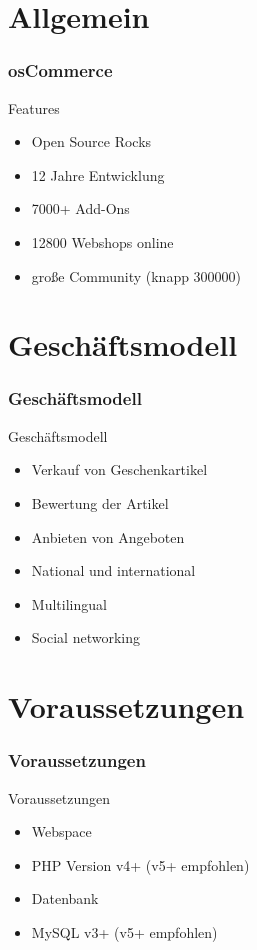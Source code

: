 \documentclass[xcolor=dvipsnames]{beamer}
\begin{document}
\section{Allgemein}
\begin{frame} %
  \frametitle{osCommerce} %
  \begin{block}{Features}
	  \begin{itemize}
		\item Open Source Rocks
		\item 12 Jahre Entwicklung
		\item 7000+ Add-Ons
		\item 12800 Webshops online
		\item große Community (knapp 300000)
	  \end{itemize}
  \end{block}
\end{frame}

\section{Geschäftsmodell}
\begin{frame} %
  \frametitle{Geschäftsmodell} %
  \begin{block}{Geschäftsmodell}
	  \begin{itemize}
		\item Verkauf von Geschenkartikel
		\item Bewertung der Artikel
		\item Anbieten von Angeboten
		\item National und international
		\item Multilingual
		\item Social networking
	  \end{itemize}
  \end{block}
\end{frame}

\section{Voraussetzungen}
\begin{frame} %
  \frametitle{Voraussetzungen} %
  \begin{block}{Voraussetzungen}
	  \begin{itemize}
		\item Webspace
		\item PHP Version v4+ (v5+ empfohlen)
		\item Datenbank
		\item MySQL v3+ (v5+ empfohlen)
	  \end{itemize}
  \end{block}
\end{frame}
\end{document}
